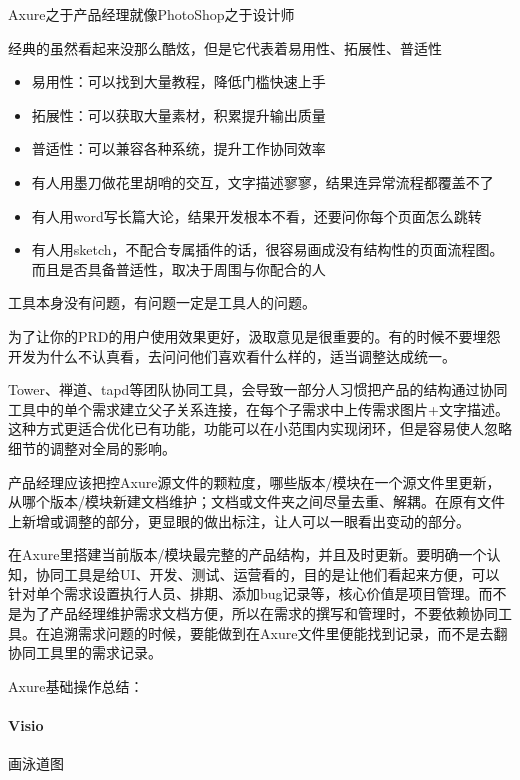 \documentclass[letterpaper,11pt,english]{sphinxmanual}
\begin{document}
Axure之于产品经理就像PhotoShop之于设计师

经典的虽然看起来没那么酷炫，但是它代表着易用性、拓展性、普适性
\begin{itemize}
\item {} 
易用性：可以找到大量教程，降低门槛快速上手

\item {} 
拓展性：可以获取大量素材，积累提升输出质量

\item {} 
普适性：可以兼容各种系统，提升工作协同效率

\item {} 
有人用墨刀做花里胡哨的交互，文字描述寥寥，结果连异常流程都覆盖不了

\item {} 
有人用word写长篇大论，结果开发根本不看，还要问你每个页面怎么跳转

\item {} 
有人用sketch，不配合专属插件的话，很容易画成没有结构性的页面流程图。而且是否具备普适性，取决于周围与你配合的人

\end{itemize}

工具本身没有问题，有问题一定是工具人的问题。

为了让你的PRD的用户使用效果更好，汲取意见是很重要的。有的时候不要埋怨开发为什么不认真看，去问问他们喜欢看什么样的，适当调整达成统一。

Tower、禅道、tapd等团队协同工具，会导致一部分人习惯把产品的结构通过协同工具中的单个需求建立父子关系连接，在每个子需求中上传需求图片+文字描述。这种方式更适合优化已有功能，功能可以在小范围内实现闭环，但是容易使人忽略细节的调整对全局的影响。

产品经理应该把控Axure源文件的颗粒度，哪些版本/模块在一个源文件里更新，从哪个版本/模块新建文档维护；文档或文件夹之间尽量去重、解耦。在原有文件上新增或调整的部分，更显眼的做出标注，让人可以一眼看出变动的部分。

在Axure里搭建当前版本/模块最完整的产品结构，并且及时更新。要明确一个认知，协同工具是给UI、开发、测试、运营看的，目的是让他们看起来方便，可以针对单个需求设置执行人员、排期、添加bug记录等，核心价值是项目管理。而不是为了产品经理维护需求文档方便，所以在需求的撰写和管理时，不要依赖协同工具。在追溯需求问题的时候，要能做到在Axure文件里便能找到记录，而不是去翻协同工具里的需求记录。

Axure基础操作总结：


\paragraph{Visio}
\label{\detokenize{chapter_knowledge/tools:visio}}
画泳道图%
\begin{footnote}[503]\sphinxAtStartFootnote
{}
%
\end{footnote}
\end{document}
